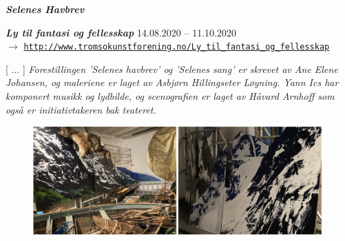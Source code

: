 \newpage 

{\Large \textsl{\textbf{Selenes Havbrev}}}

\bigskip

\noindent \textbf{\textsl{Ly til fantasi og fellesskap}} 14.08.2020 -- 11.10.2020 \vspace{1mm} \\ 
$\rightarrow$ \href{http://www.tromsokunstforening.no/default.asp?cmd=100&UtsID=200}{\texttt{\footnotesize http://www.tromsokunstforening.no/Ly\_til\_fantasi\_og\_fellesskap}} 

\bigskip

[ ... ] \textsl{Forestillingen 'Selenes havbrev' og 'Selenes sang' er skrevet av Ane Elene Johansen, og maleriene er laget av Asbjørn Hillingseter Løyning. Yann Ics har komponert musikk og lydbilde, og scenografien er laget av Håvard Arnhoff som også er initiativtakeren bak teateret.}

\smallskip

\begin{figure}[h]
	\begin{center}
		\includegraphics[width=0.99\textwidth]{mp/img/img2}
		\label{sh}
	\end{center}
\end{figure}

